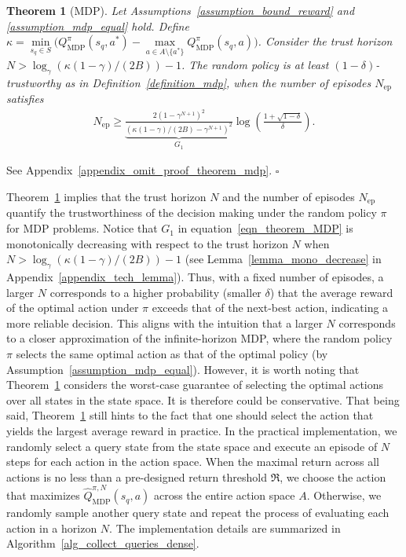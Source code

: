 \documentclass[10pt]{article}
\def\eqref#1{equation~\ref{#1}}
\newtheorem{theorem}{Theorem}
\newenvironment{myproof}{{\noindent\it Proof. }}{\hfill $\square$ \par}
\begin{document}
\begin{theorem}[MDP]\label{theorem_mdp}
Let Assumptions~\ref{assumption_bound_reward} and \ref{assumption_mdp_equal} hold.
 Define $\kappa = \min\limits_{s_q \in S} \big( Q_\text{MDP}^\pi(s_q, a^*) - \max\limits_{a \in A \setminus \{a^*\}} Q_\text{MDP}^\pi(s_q, a) \big)$. Consider the trust horizon $N > \log_\gamma \left( \kappa (1-\gamma)/(2B) \right)-1$. The random policy is at least $(1-\delta)$-trustworthy as in Definition~\ref{definition_mdp}, when the number of episodes $N_\text{ep}$ satisfies
\begin{align}\label{eqn_theorem_MDP}
    N_\text{ep}  \geq \underbrace{ \frac{ 2 \left( 1-\gamma^{N+1}\right)^2}{ \left( \kappa \left( 1-\gamma \right) / (2B) - \gamma^{N+1}\right)^2} }_{G_1}   \log \left( \frac{1+\sqrt{1-\delta}}{\delta} \right).
\end{align}
\end{theorem}
\begin{myproof}
    See Appendix~\ref{appendix_omit_proof_theorem_mdp}.
\end{myproof}
Theorem~\ref{theorem_mdp} implies that the trust horizon $N$ and the number of episodes $N_\text{ep}$ quantify the trustworthiness of the decision making under the random policy $\pi$ for MDP problems. Notice that $G_1$ in \eqref{eqn_theorem_MDP} is monotonically decreasing with respect to the trust horizon $N$ when $N > \log_\gamma \left( \kappa (1-\gamma)/(2B) \right)-1$ (see Lemma~\ref{lemma_mono_decrease} in Appendix~\ref{appendix_tech_lemma}). Thus, with a fixed number of episodes, a larger $N$ corresponds to a higher probability (smaller $\delta$) that the average reward of the optimal action under $\pi$ exceeds that of the next-best action, indicating a more reliable decision.
This aligns with the intuition that a larger $N$ corresponds to a closer approximation of the infinite-horizon MDP, where the random policy $\pi$ selects the same optimal action as that of the optimal policy (by Assumption~\ref{assumption_mdp_equal}).
However, it is worth noting that Theorem~\ref{theorem_mdp} considers the worst-case guarantee of selecting the optimal actions over all states in the state space. It is therefore could be conservative. That being said, Theorem~\ref{theorem_mdp} still hints to the fact that one should select the action that yields the largest average reward in practice.
In the practical implementation, we randomly select a query state from the state space and execute an episode of $N$ steps for each action in the action space. When the maximal return across all actions is no less than a pre-designed return threshold $\mathfrak{R}$, we choose the action that maximizes $\hat{Q}_\text{MDP}^{\pi, N}(s_q, a)$ across the entire action space $A$. Otherwise, we randomly sample another query state and repeat the process of evaluating each action in a horizon $N$. The implementation details are summarized in Algorithm~\ref{alg_collect_queries_dense}.
\end{document}
